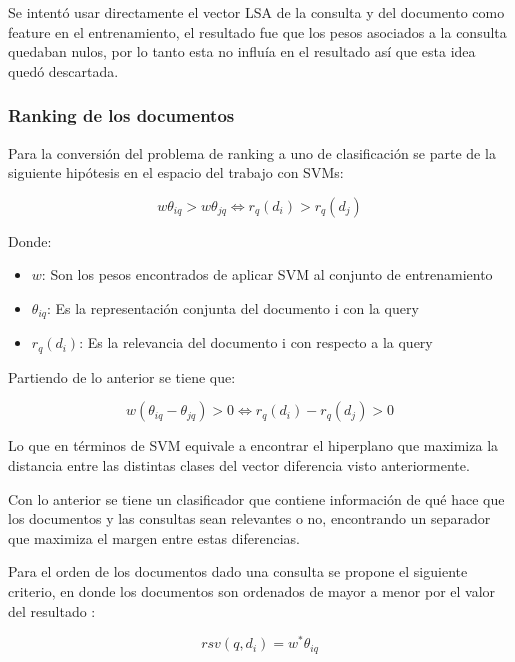 \documentclass[runningheads]{llncs}
\begin{document}
Se intentó usar directamente el vector LSA de la consulta y del documento como feature en el entrenamiento,
el resultado fue que los pesos asociados a la consulta quedaban nulos, por lo tanto esta no influía en el
resultado así que esta idea quedó descartada.

\subsubsection{Ranking de los documentos}

Para la conversión del problema de ranking a uno de clasificación se parte de la siguiente
hipótesis en el espacio del trabajo con SVMs:


\begin{equation}
w\theta_{iq} > w\theta_{jq} \iff r_q(d_i) > r_q(d_j)
\end{equation}

Donde:

\begin{itemize}

	\item $w$: Son los pesos encontrados de aplicar SVM al conjunto de entrenamiento
	\item $\theta_{iq}$: Es la representación conjunta del documento i con la query
	\item $r_q(d_i)$: Es la relevancia del documento i con respecto a la query
	
\end{itemize}

Partiendo de lo anterior se tiene que:

\begin{equation}
w(\theta_{iq} - \theta_{jq}) > 0 \iff r_q(d_i) - r_q(d_j) > 0
\end{equation}

Lo que en términos de SVM equivale a encontrar el hiperplano que maximiza la distancia entre las distintas clases
del vector diferencia visto anteriormente.

Con lo anterior se tiene un clasificador que contiene información de qué hace que los documentos y las 
consultas sean relevantes o no, encontrando un separador que maximiza el margen entre estas diferencias.

Para el orden de los documentos dado una consulta se propone el siguiente criterio, en donde los documentos son
ordenados de mayor a menor por el valor del resultado \cite{rankSVM}:

\begin{equation}
rsv(q, d_i) = w^* \theta_{iq}
\end{equation}
\end{document}
